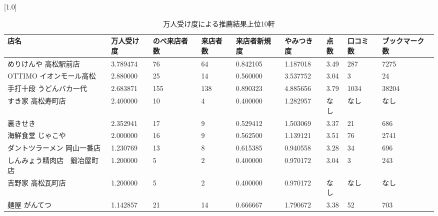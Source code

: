 \begin{table}[H]
\centering
\caption{万人受け度による推薦結果上位10軒}
\label{table::acceptability}
\small
\scalebox{0.7}[1.0]{
\begin{tabular}{|l|l|l|l|l|l|l|l|l|}
\hline
店名                   & 万人受け度    & のべ来店者数 & 来店者数 & 来店者新規度   & やみつき度    & 点数    & 口コミ数  & ブックマーク数 \\ \hline
めりけんや 高松駅前店          & 3.789474 & 76     & 64   & 0.842105 & 1.187018 & 3.49  & 287   & 7275    \\ \hline
OTTIMO イオンモール高松      & 2.880000 & 25     & 14   & 0.560000 & 3.537752 & 3.04  & 3     & 24      \\ \hline
手打十段 うどんバカ一代         & 2.683871 & 155    & 138  & 0.890323 & 4.885656 & 3.79  & 1034  & 38204   \\ \hline
すき家 高松寿町店            & 2.400000 & 10     & 4    & 0.400000 & 1.282957 & なし & なし & なし   \\ \hline
裏きせき                 & 2.352941 & 17     & 9    & 0.529412 & 1.503069 & 3.37  & 21    & 686     \\ \hline
海鮮食堂 じゃこや            & 2.000000 & 16     & 9    & 0.562500 & 1.139121 & 3.51  & 76    & 2741    \\ \hline
ダントツラーメン 岡山一番店 & 1.230769 & 13     & 8    & 0.615385 & 0.940558 & 3.28  & 34    & 696     \\ \hline
しんみょう精肉店　鍛冶屋町店       & 1.200000 & 5      & 2    & 0.400000 & 0.970172 & 3.04  & 3     & 243     \\ \hline
吉野家 高松瓦町店            & 1.200000 & 5      & 2    & 0.400000 & 0.970172 & なし & なし & なし   \\ \hline
麺屋 がんてつ              & 1.142857 & 21     & 14   & 0.666667 & 1.790672 & 3.38  & 52    & 703     \\ \hline
\end{tabular}
}
\end{table}

